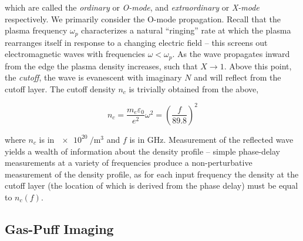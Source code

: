 \noindent which are called the \emph{ordinary} or \emph{O-mode}, and \emph{extraordinary} or \emph{X-mode} respectively.  We primarily consider the O-mode propagation.  Recall that the plasma frequency $\omega_p$ characterizes a natural ``ringing'' rate at which the plasma rearranges itself in response to a changing electric field -- this screens out electromagnetic waves with frequencies $\omega < \omega_p$.  As the wave propagates inward from the edge the plasma density increases, such that $X \rightarrow 1$.  Above this point, the \emph{cutoff}, the wave is evanescent with imaginary $N$ and will reflect from the cutoff layer.  The cutoff density $n_c$ is trivially obtained from the above,

\begin{equation}\label{eq:n_cutoff}
 n_c = \frac{m_e \varepsilon_0}{e^2} \omega^2 = \left(\frac{f}{89.8}\right)^2
\end{equation}

\noindent where $n_c$ is in $\SI{e20}{\per\meter\cubed}$ and $f$ is in $\si{\giga\hertz}$.  Measurement of the reflected wave yields a wealth of information about the density profile -- simple phase-delay measurements at a variety of frequencies produce a non-perturbative measurement of the density profile, as for each input frequency the density at the cutoff layer (the location of which is derived from the phase delay) must be equal to $n_c(f)$.

\subsection{Gas-Puff Imaging}\label{subsec:app_gpi}

\nicechapterending


